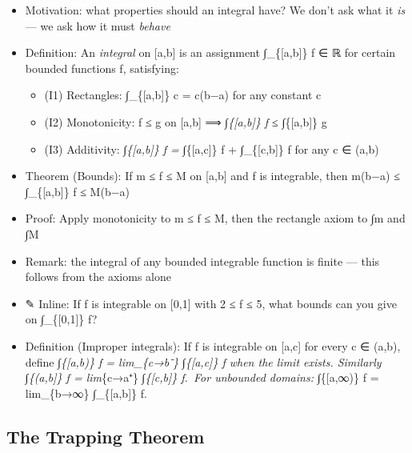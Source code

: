 \documentclass[
  10pt,
  letterpaper,
]{scrbook}
\providecommand{\tightlist}{%
  \setlength{\itemsep}{0pt}\setlength{\parskip}{0pt}}
\begin{document}
\begin{itemize}
\tightlist
\item
  Motivation: what properties should an integral have? We don't ask what
  it \emph{is} --- we ask how it must \emph{behave}
\item
  Definition: An \emph{integral} on {[}a,b{]} is an assignment
  ∫\_\{{[}a,b{]}\} f ∈ ℝ for certain bounded functions f, satisfying:

  \begin{itemize}
  \tightlist
  \item
    (I1) Rectangles: ∫\_\{{[}a,b{]}\} c = c(b−a) for any constant c
  \item
    (I2) Monotonicity: f ≤ g on {[}a,b{]} ⟹ ∫\emph{\{{[}a,b{]}\} f ≤
    ∫}\{{[}a,b{]}\} g
  \item
    (I3) Additivity: ∫\emph{\{{[}a,b{]}\} f = ∫}\{{[}a,c{]}\} f +
    ∫\_\{{[}c,b{]}\} f for any c ∈ (a,b)
  \end{itemize}
\item
  Theorem (Bounds): If m ≤ f ≤ M on {[}a,b{]} and f is integrable, then
  m(b−a) ≤ ∫\_\{{[}a,b{]}\} f ≤ M(b−a)
\item
  Proof: Apply monotonicity to m ≤ f ≤ M, then the rectangle axiom to ∫m
  and ∫M
\item
  Remark: the integral of any bounded integrable function is finite ---
  this follows from the axioms alone
\item
  ✎ Inline: If f is integrable on {[}0,1{]} with 2 ≤ f ≤ 5, what bounds
  can you give on ∫\_\{{[}0,1{]}\} f?
\item
  Definition (Improper integrals): If f is integrable on {[}a,c{]} for
  every c ∈ (a,b), define ∫\emph{\{{[}a,b)\} f = lim\_\{c→b⁻\}
  ∫\emph{\{{[}a,c{]}\} f when the limit exists. Similarly ∫}\{(a,b{]}\}
  f = lim}\{c→a⁺\} ∫\emph{\{{[}c,b{]}\} f.~For unbounded domains:
  ∫}\{{[}a,∞)\} f = lim\_\{b→∞\} ∫\_\{{[}a,b{]}\} f.
\end{itemize}

\subsection{The Trapping Theorem}\label{the-trapping-theorem}
\end{document}
